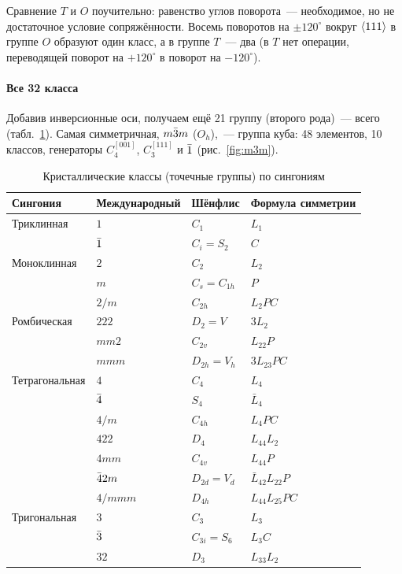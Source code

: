 Сравнение $T$ и $O$ поучительно: равенство углов поворота~— необходимое,
но не достаточное условие сопряжённости. Восемь поворотов на $\pm120^\circ$
вокруг $\langle 111\rangle$ в группе $O$ образуют один класс, а в группе $T$~— два (в
$T$ нет операции, переводящей поворот на $+120^\circ$ в поворот на
$-120^\circ$).

\paragraph{Все 32 класса}
Добавив инверсионные оси, получаем ещё 21 группу (второго рода)~— всего
 (табл.~\ref{tab:point-groups}). Самая
симметричная, $m\bar{3}m$ ($O_h$),~— группа куба: 48 элементов, 10 классов,
генераторы $C_4^{[001]}$, $C_3^{[111]}$ и $\bar{1}$ (рис.~\ref{fig:m3m}).

\begin{table}[p]
\centering
\caption{Кристаллические классы (точечные группы) по сингониям}\label{tab:point-groups}
\small\renewcommand{\arraystretch}{1.08}
\begin{tabular}{@{}llll@{}}
\toprule
Сингония & Международный & Шёнфлис & Формула симметрии\\
\midrule
Триклинная & $1$ & $C_1$ & $L_1$\\
 & $\bar{1}$ & $C_i=S_2$ & $C$\\
\midrule
Моноклинная & $2$ & $C_2$ & $L_2$\\
 & $m$ & $C_s=C_{1h}$ & $P$\\
 & $2/m$ & $C_{2h}$ & $L_2PC$\\
\midrule
Ромбическая & $222$ & $D_2=V$ & $3L_2$\\
 & $mm2$ & $C_{2v}$ & $L_22P$\\
 & $mmm$ & $D_{2h}=V_h$ & $3L_23PC$\\
\midrule
Тетрагональная & $4$ & $C_4$ & $L_4$\\
 & $\bar{4}$ & $S_4$ & $\bar L_4$\\
 & $4/m$ & $C_{4h}$ & $L_4PC$\\
 & $422$ & $D_4$ & $L_44L_2$\\
 & $4mm$ & $C_{4v}$ & $L_44P$\\
 & $\bar{4}2m$ & $D_{2d}=V_d$ & $\bar L_42L_22P$\\
 & $4/mmm$ & $D_{4h}$ & $L_44L_25PC$\\
\midrule
Тригональная & $3$ & $C_3$ & $L_3$\\
 & $\bar{3}$ & $C_{3i}=S_6$ & $L_3C$\\
 & $32$ & $D_3$ & $L_33L_2$\\

\end{tabular}
\end{table}
